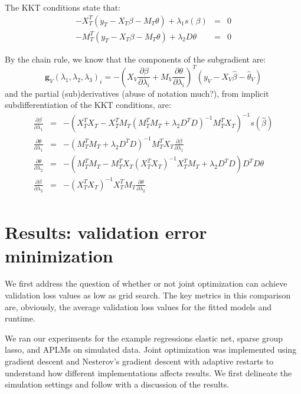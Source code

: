 \documentclass[10pt,letterpaper]{article}
\begin{document}
The KKT conditions state that:
\begin{equation}
\begin{array}{lcl}
-X_T^T(y_T - X_T \beta - M_T \theta) + \lambda_1 s(\beta) &=& 0 \\
-M_T^T(y_T - X_T \beta - M_T \theta) + \lambda_2 D \theta &=& 0
\end{array}
\end{equation}

By the chain rule, we know that the components of the subgradient are:
\begin{equation}
\boldsymbol{g}_V(\lambda_1, \lambda_2, \lambda_3)_i = -(X_V \frac{\partial \beta}{\partial \lambda_i} + M_V \frac{\partial \theta}{\partial \lambda_i})^T(y_V - X_V \hat \beta - \hat \theta_V)
\end{equation}
and the partial (sub)derivatives (abuse of notation much?), from implicit subdifferentiation of the KKT conditions, are:
\begin{equation}
\begin{array}{lcl}
\frac{\partial \beta}{\partial \lambda_1} &=& -(X_T^T X_T - X_T^T M_T(M_T^T M_T + \lambda_2 D^TD)^{-1} M_T^T X_T)^{-1} s(\hat \beta) \\
\frac{\partial \theta}{\partial \lambda_1} &=& -(M_T^T M_T + \lambda_2 D^T D)^{-1} M_T^T X_T \frac{\partial \beta}{\partial \lambda_1}
\\
\frac{\partial \theta}{\partial \lambda_2} &=& -(M_T^T M_T - M_T^T X_T (X_T^TX_T)^{-1} X_T^T M_T + \lambda_2 D^TD) D^TD \theta
\\
\frac{\partial \beta}{\partial \lambda_2} &=& - (X_T^TX_T)^{-1} X_T^T M_T \frac{\partial \theta}{\partial \lambda_2} \\
\end{array}
\end{equation}


\section{Results: validation error minimization}

We first address the question of whether or not joint optimization can achieve validation loss values as low as grid search. The key metrics in this comparison are, obviously, the average validation loss values for the fitted models and runtime.

We ran our experiments for the example regressions elastic net, sparse group lasso, and APLMs on simulated data. Joint optimization was implemented using gradient descent and Nesterov's gradient descent with adaptive restarts to understand how different implementations affects results. We first delineate the simulation settings and follow with a discussion of the results.
\end{document}
